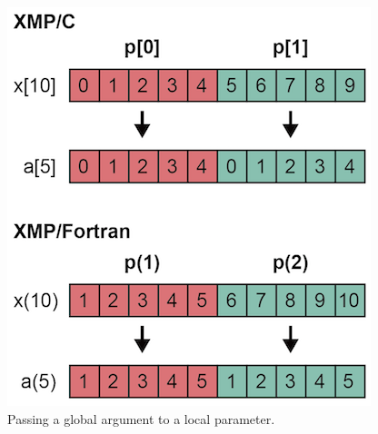 \begin{figure}
  \centering
  \includegraphics{figs/duplicated_array.png}
  \caption{Passing a global argument to a local parameter.}
\end{figure}